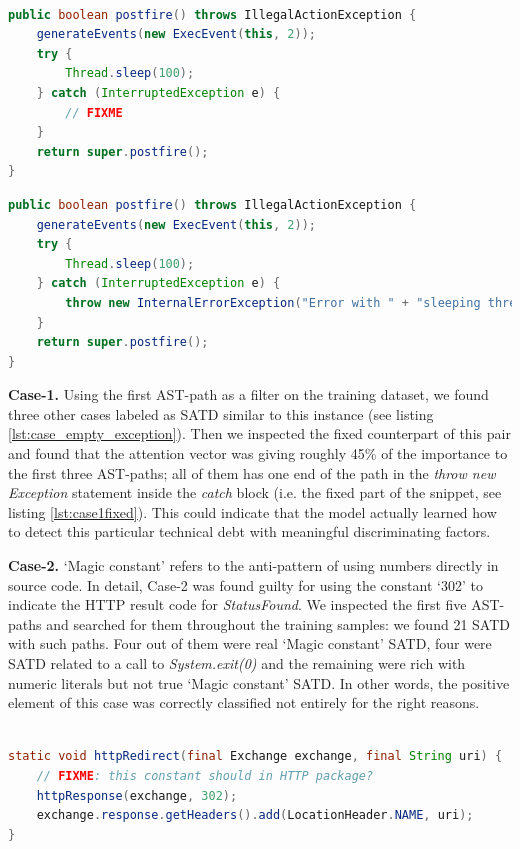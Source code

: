 \begin{lstlisting}[caption={Case-1 SATD, verbatim source code}, label={lst:case_empty_exception},language=Java]

public boolean postfire() throws IllegalActionException {
    generateEvents(new ExecEvent(this, 2));
    try {
        Thread.sleep(100);
    } catch (InterruptedException e) {
        // FIXME
    }
    return super.postfire();
}

\end{lstlisting}

\begin{lstlisting}[caption={Case-1 fixed, verbatim source code}, label={lst:case1fixed},language=Java]
public boolean postfire() throws IllegalActionException {
    generateEvents(new ExecEvent(this, 2));
    try {
        Thread.sleep(100);
    } catch (InterruptedException e) {
        throw new InternalErrorException("Error with " + "sleeping thread in postfire");
    }
    return super.postfire();
}
\end{lstlisting}


\textbf{Case-1.} Using the first AST-path as a filter on the training dataset, we found three other cases labeled as SATD similar to this instance (see listing \ref{lst:case_empty_exception}). Then we inspected the fixed counterpart of this pair and found that the attention vector was giving roughly 45\% of the importance to the first three AST-paths; all of them has one end of the path in the \textit{throw new Exception} statement inside the \textit{catch} block (i.e. the fixed part of the snippet, see listing \ref{lst:case1fixed}). This could indicate that the model actually learned how to detect this particular technical debt with meaningful discriminating factors.


\textbf{Case-2.} `Magic constant' refers to the anti-pattern of using numbers directly in source code. In detail, Case-2 was found guilty for using the constant `302' to indicate the HTTP result code for \textit{StatusFound}. We inspected the first five AST-paths and searched for them throughout the training samples: we found 21 SATD with such paths. Four out of them were real `Magic constant' SATD, four were SATD related to a call to \textit{System.exit(0)} and the remaining were rich with numeric literals but not true `Magic constant' SATD. In other words, the positive element of this case was correctly classified not entirely for the right reasons.



\begin{lstlisting}[caption={Correctly detected SATD, verbatim Case-2}, label={lst:case_magic_constant},language=Java]

static void httpRedirect(final Exchange exchange, final String uri) {
    // FIXME: this constant should in HTTP package?
    httpResponse(exchange, 302);
    exchange.response.getHeaders().add(LocationHeader.NAME, uri);
}

\end{lstlisting}


